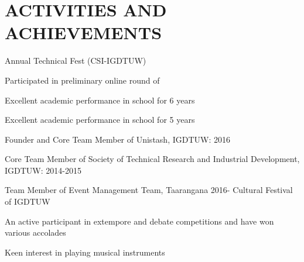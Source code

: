 \documentclass[]{deedy-resume-openfont}
\begin{document}
\begin{minipage}[t]{0.66\textwidth}
\section{ACTIVITIES AND ACHIEVEMENTS} 
\begin{tightemize}
\item {}Annual Technical Fest (CSI-IGDTUW)
\item Participated in preliminary online round of 
\item {}Excellent academic performance in school for 6 years
\item {}Excellent academic performance in school for 5 years
\end{tightemize}
\sectionsep

\begin{tightemize}
\item Founder and Core Team Member of Unistash, IGDTUW: 2016
\item Core Team Member of Society of Technical Research and Industrial Development, IGDTUW: 2014-2015
\item Team Member of Event Management Team, Taarangana 2016- Cultural Festival of IGDTUW \\
\end{tightemize}
\sectionsep

\begin{tightemize}
\item An active participant in extempore and debate competitions and have won various accolades
\item Keen interest in playing musical instruments
\end{tightemize} 

\end{minipage} 
\end{document}
